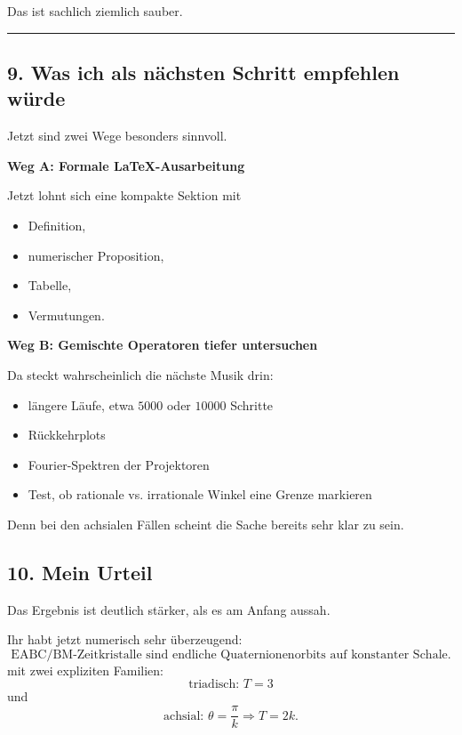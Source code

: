 \documentclass[11pt,a4paper]{article}
\theoremstyle{definition}
\begin{document}
	Das ist sachlich ziemlich sauber.
	
	\medskip\hrule\medskip
	
	\subsection*{9. Was ich als nächsten Schritt empfehlen würde}
	
	Jetzt sind zwei Wege besonders sinnvoll.
	
	\textbf{Weg A: Formale LaTeX-Ausarbeitung}
	
	Jetzt lohnt sich eine kompakte Sektion mit
	\begin{itemize}
		\item Definition,
		\item numerischer Proposition,
		\item Tabelle,
		\item Vermutungen.
	\end{itemize}
	
	\textbf{Weg B: Gemischte Operatoren tiefer untersuchen}
	
	Da steckt wahrscheinlich die nächste Musik drin:
	\begin{itemize}
		\item längere Läufe, etwa $5000$ oder $10000$ Schritte
		\item Rückkehrplots
		\item Fourier-Spektren der Projektoren
		\item Test, ob rationale vs. irrationale Winkel eine Grenze markieren
	\end{itemize}
	Denn bei den achsialen Fällen scheint die Sache bereits sehr klar zu sein.
	
	\subsection*{10. Mein Urteil}
	
	Das Ergebnis ist deutlich stärker, als es am Anfang aussah.
	
	Ihr habt jetzt numerisch sehr überzeugend:
	\[
	\text{EABC/BM-Zeitkristalle sind endliche Quaternionenorbits auf konstanter Schale.}
	\]
	mit zwei expliziten Familien:
	\[
	\text{triadisch: } T=3
	\]
	und
	\[
	\text{achsial: } \theta=\frac{\pi}{k}\Rightarrow T=2k.
	\]
	
\end{document}
